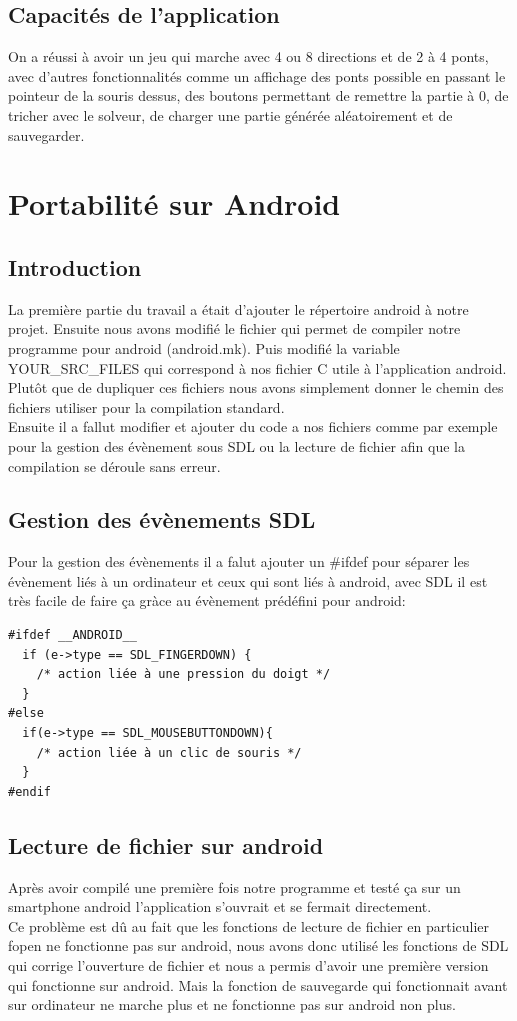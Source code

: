 \documentclass[12pt]{report}
\begin{document}
\section{Capacités de l'application}
On a réussi à avoir un jeu qui marche avec 4 ou 8 directions et de 2 à 4 ponts, avec d'autres fonctionnalités comme un affichage des ponts possible en passant le pointeur de la souris dessus, des boutons permettant de remettre la partie à 0, de tricher avec le solveur, de charger une partie générée aléatoirement et de sauvegarder.

\chapter{Portabilité sur Android}
\section{Introduction}
\textnormal{La première partie du travail a était d'ajouter le répertoire android à notre projet. Ensuite nous avons modifié le fichier qui permet de compiler notre programme pour android (android.mk). Puis modifié la variable YOUR\_SRC\_FILES qui correspond à nos fichier C utile à l'application android. Plutôt que de dupliquer ces fichiers nous avons simplement donner le chemin des fichiers utiliser pour la compilation standard.\\Ensuite il a fallut modifier et ajouter du code a nos fichiers comme par exemple pour la gestion des évènement sous SDL ou la lecture de fichier afin que la compilation se déroule sans erreur.}
\section{Gestion des évènements SDL}
\textnormal{Pour la gestion des évènements il a falut ajouter un \#ifdef pour séparer les évènement liés à un ordinateur et ceux qui sont liés à android, avec SDL il est très facile de faire ça gràce au évènement prédéfini pour android:}
\begin{verbatim}
#ifdef __ANDROID__
  if (e->type == SDL_FINGERDOWN) {
    /* action liée à une pression du doigt */
  }
#else
  if(e->type == SDL_MOUSEBUTTONDOWN){
    /* action liée à un clic de souris */
  }
#endif
\end{verbatim}
\section{Lecture de fichier sur android}
\textnormal{Après avoir compilé une première fois notre programme et testé ça sur un smartphone android l'application s'ouvrait et se fermait directement.\\Ce problème est dû au fait que les fonctions de lecture de fichier en particulier fopen ne fonctionne pas sur android, nous avons donc utilisé les fonctions de SDL qui corrige l'ouverture de fichier et nous a permis d'avoir une première version qui fonctionne sur android. Mais la fonction de sauvegarde qui fonctionnait avant sur ordinateur ne marche plus et ne fonctionne pas sur android non plus.}
\end{document}
